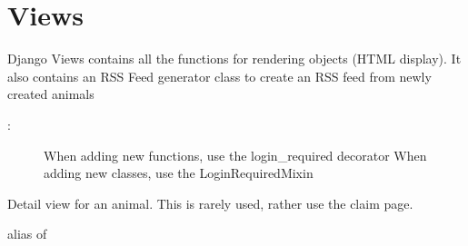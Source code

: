 \documentclass[letterpaper,10pt,openany,oneside,english]{sphinxmanual}
\begin{document}
\begin{sphinxVerbatim}[commandchars=\\\{\},numbers=left,firstnumber=1,stepnumber=1]
     
         
              
              

\end{sphinxVerbatim}


\section{Views}
\label{\detokenize{index:module-animals.views}}\label{\detokenize{index:views}}
Django Views contains all the functions for rendering objects (HTML display).
It also contains an RSS Feed generator class to create an RSS feed from newly created animals
\begin{description}
\item[{:}] \leavevmode
When adding new functions, use the login\_required decorator
When adding new classes, use the LoginRequiredMixin

\end{description}

\begin{fulllineitems}
\label{\detokenize{index:animals.views.AnimalDetailView}}
Detail view for an animal.
This is rarely used, rather use the claim page.

\begin{fulllineitems}
\label{\detokenize{index:animals.views.AnimalDetailView.model}}
alias of 

\end{fulllineitems}


\end{fulllineitems}
\end{document}

